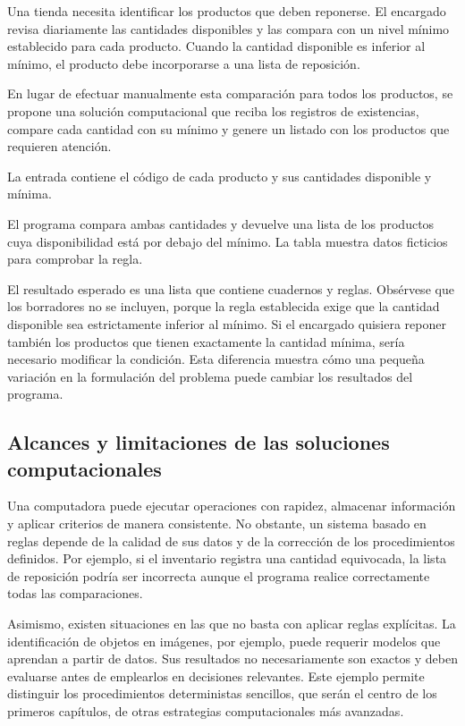 Una tienda necesita identificar los productos que deben reponerse. El encargado revisa diariamente las cantidades disponibles y las compara con un nivel mínimo establecido para cada producto. Cuando la cantidad disponible es inferior al mínimo, el producto debe incorporarse a una lista de reposición.

En lugar de efectuar manualmente esta comparación para todos los productos, se propone una solución computacional que reciba los registros de existencias, compare cada cantidad con su mínimo y genere un listado con los productos que requieren atención.

La entrada contiene el código de cada producto y sus cantidades disponible y mínima.

El programa compara ambas cantidades y devuelve una lista de los productos cuya disponibilidad está por debajo del mínimo. La tabla muestra datos ficticios para comprobar la regla.



El resultado esperado es una lista que contiene cuadernos y reglas. Obsérvese que los borradores no se incluyen, porque la regla establecida exige que la cantidad disponible sea estrictamente inferior al mínimo. Si el encargado quisiera reponer también los productos que tienen exactamente la cantidad mínima, sería necesario modificar la condición. Esta diferencia muestra cómo una pequeña variación en la formulación del problema puede cambiar los resultados del programa.

\subsection{Alcances y limitaciones de las soluciones computacionales}

Una computadora puede ejecutar operaciones con rapidez, almacenar información y aplicar criterios de manera consistente. No obstante, un sistema basado en reglas depende de la calidad de sus datos y de la corrección de los procedimientos definidos. Por ejemplo, si el inventario registra una cantidad equivocada, la lista de reposición podría ser incorrecta aunque el programa realice correctamente todas las comparaciones.

Asimismo, existen situaciones en las que no basta con aplicar reglas explícitas. La identificación de objetos en imágenes, por ejemplo, puede requerir modelos que aprendan a partir de datos. Sus resultados no necesariamente son exactos y deben evaluarse antes de emplearlos en decisiones relevantes. Este ejemplo permite distinguir los procedimientos deterministas sencillos, que serán el centro de los primeros capítulos, de otras estrategias computacionales más avanzadas.

